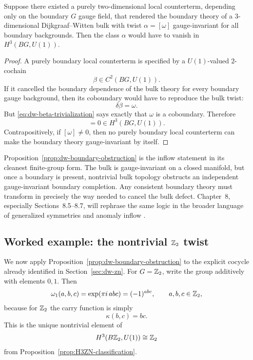 \begin{proposition}\label{prop:dw-boundary-obstruction}
Suppose there existed a purely two-dimensional local counterterm, depending only on the boundary $G$ gauge field, that rendered the boundary theory of a $3$-dimensional Dijkgraaf--Witten bulk with twist $\alpha=[\omega]$ gauge-invariant for all boundary backgrounds. Then the class $\alpha$ would have to vanish in $H^3(BG,U(1))$.
\end{proposition}

\begin{proof}
A purely boundary local counterterm is specified by a $U(1)$-valued $2$-cochain
\begin{equation*}
\beta \in C^2(BG,U(1)).
\end{equation*}
If it cancelled the boundary dependence of the bulk theory for every boundary gauge background, then its coboundary would have to reproduce the bulk twist:
\begin{equation}\label{eq:dw-beta-trivialization}
\delta \beta = \omega.
\end{equation}
But \eqref{eq:dw-beta-trivialization} says exactly that $\omega$ is a coboundary. Therefore
\begin{equation*}
[\omega]=0\in H^3(BG,U(1)).
\end{equation*}
Contrapositively, if $[\omega]\neq 0$, then no purely boundary local counterterm can make the boundary theory gauge-invariant by itself.
\end{proof}

\noindent Proposition~\ref{prop:dw-boundary-obstruction} is the inflow statement in its cleanest finite-group form. The bulk is gauge-invariant on a closed manifold, but once a boundary is present, nontrivial bulk topology obstructs an independent gauge-invariant boundary completion. Any consistent boundary theory must transform in precisely the way needed to cancel the bulk defect. Chapter~8, especially Sections~8.5--8.7, will rephrase the same logic in the broader language of generalized symmetries and anomaly inflow \cite{FreedMooreTeleman2024,Bhardwaj2023Lectures}.

\subsection{Worked example: the nontrivial \texorpdfstring{$\mathbb{Z}_2$}{Z\_2} twist}

We now apply Proposition~\ref{prop:dw-boundary-obstruction} to the explicit cocycle already identified in Section~\ref{sec:dw-zn}. For $G=\mathbb{Z}_2$, write the group additively with elements $0,1$. Then
\begin{equation}\label{eq:omega-z2}
\omega_1(a,b,c)
=
\exp\!\left(\pi i\,abc\right)
=
(-1)^{abc},
\qquad
a,b,c\in \mathbb{Z}_2,
\end{equation}
because for $\mathbb{Z}_2$ the carry function is simply
\begin{equation*}
\kappa(b,c)=bc.
\end{equation*}
This is the unique nontrivial element of
\begin{equation*}
H^3(B\mathbb{Z}_2,U(1))\cong \mathbb{Z}_2
\end{equation*}
from Proposition~\ref{prop:H3ZN-classification}.

